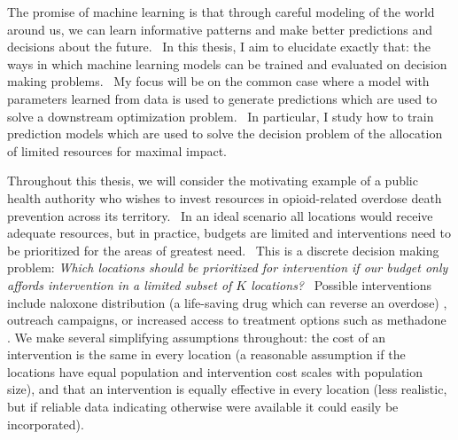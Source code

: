The promise of machine learning is that through careful modeling of the world around us, we can learn informative patterns and make better predictions and decisions about the future. \
In this thesis, I aim to elucidate exactly that: the ways in which machine learning models can be trained and evaluated on decision making problems. \
My focus will be on the common case where a model with parameters learned from data is used to generate predictions which are used to solve a downstream optimization problem. \
In particular, I study how to train prediction models which are used to solve the decision problem of the allocation of limited resources for maximal impact.

Throughout this thesis, we will consider the motivating example of a public health authority who wishes to invest resources in opioid-related overdose death prevention across its territory. \
In an ideal scenario all locations would receive adequate resources, but in practice, budgets are limited and interventions need to be prioritized for the areas of greatest need. \
This is a  discrete decision making problem: \textit{Which locations should be prioritized for intervention if our budget only affords intervention in a limited subset of $K$ locations?} \
Possible interventions include naloxone distribution (a life-saving drug which can reverse an overdose) \citep{clarkSystematicReviewCommunity2014,hawkReducingFatalOpioid2015,peiperFentanylTestStrips2019},  outreach campaigns, or increased access to treatment options such as methadone \citep{mattickBuprenorphineMaintenancePlacebo2014,leshnerMedicationsOpioidUse2019}.
We make several simplifying assumptions throughout: the cost of an intervention is the same in every location (a reasonable assumption if the locations have equal population and intervention cost scales with population size), and that an intervention is equally effective in every location (less realistic, but if reliable data indicating otherwise were available it could easily be incorporated).

